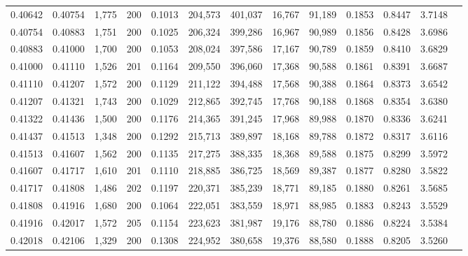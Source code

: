 \begin{tabular}{rrrrrrrrrrrrr}
0.40642 & 0.40754 & 1,775 & 200 &                                     0.1013 & 204,573 & 401,037 &  16,767 &  91,189 & 0.1853 & 0.8447 & 3.7148 \\
0.40754 & 0.40883 & 1,751 & 200 &                                     0.1025 & 206,324 & 399,286 &  16,967 &  90,989 & 0.1856 & 0.8428 & 3.6986 \\
0.40883 & 0.41000 & 1,700 & 200 &                                     0.1053 & 208,024 & 397,586 &  17,167 &  90,789 & 0.1859 & 0.8410 & 3.6829 \\
0.41000 & 0.41110 & 1,526 & 201 &                                     0.1164 & 209,550 & 396,060 &  17,368 &  90,588 & 0.1861 & 0.8391 & 3.6687 \\
0.41110 & 0.41207 & 1,572 & 200 &                                     0.1129 & 211,122 & 394,488 &  17,568 &  90,388 & 0.1864 & 0.8373 & 3.6542 \\
0.41207 & 0.41321 & 1,743 & 200 &                                     0.1029 & 212,865 & 392,745 &  17,768 &  90,188 & 0.1868 & 0.8354 & 3.6380 \\
0.41322 & 0.41436 & 1,500 & 200 &                                     0.1176 & 214,365 & 391,245 &  17,968 &  89,988 & 0.1870 & 0.8336 & 3.6241 \\
0.41437 & 0.41513 & 1,348 & 200 &                                     0.1292 & 215,713 & 389,897 &  18,168 &  89,788 & 0.1872 & 0.8317 & 3.6116 \\
0.41513 & 0.41607 & 1,562 & 200 &                                     0.1135 & 217,275 & 388,335 &  18,368 &  89,588 & 0.1875 & 0.8299 & 3.5972 \\
0.41607 & 0.41717 & 1,610 & 201 &                                     0.1110 & 218,885 & 386,725 &  18,569 &  89,387 & 0.1877 & 0.8280 & 3.5822 \\
0.41717 & 0.41808 & 1,486 & 202 &                                     0.1197 & 220,371 & 385,239 &  18,771 &  89,185 & 0.1880 & 0.8261 & 3.5685 \\
0.41808 & 0.41916 & 1,680 & 200 &                                     0.1064 & 222,051 & 383,559 &  18,971 &  88,985 & 0.1883 & 0.8243 & 3.5529 \\
0.41916 & 0.42017 & 1,572 & 205 &                                     0.1154 & 223,623 & 381,987 &  19,176 &  88,780 & 0.1886 & 0.8224 & 3.5384 \\
0.42018 & 0.42106 & 1,329 & 200 &                                     0.1308 & 224,952 & 380,658 &  19,376 &  88,580 & 0.1888 & 0.8205 & 3.5260 \\

\end{tabular}
